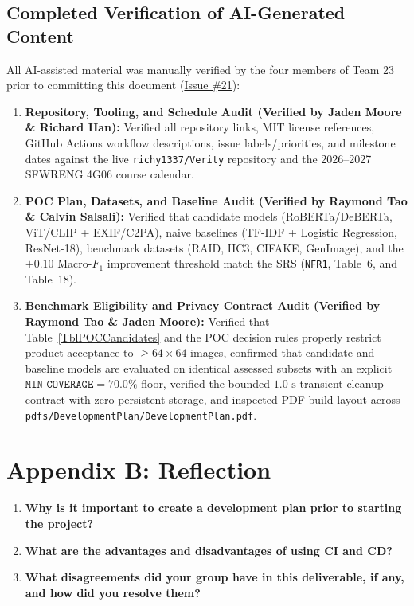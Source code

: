 \documentclass{article}
\begin{document}
\subsection*{Completed Verification of AI-Generated Content}
All AI-assisted material was manually verified by the four members of Team 23 prior to committing this document (\href{https://github.com/richy1337/Verity/issues/21}{Issue \#21}):
\begin{enumerate}[leftmargin=*]
    \item \textbf{Repository, Tooling, and Schedule Audit (Verified by Jaden Moore \& Richard Han):} Verified all repository links, MIT license references, GitHub Actions workflow descriptions, issue labels/priorities, and milestone dates against the live \texttt{richy1337/Verity} repository and the 2026--2027 SFWRENG 4G06 course calendar.
    \item \textbf{POC Plan, Datasets, and Baseline Audit (Verified by Raymond Tao \& Calvin Salsali):} Verified that candidate models (RoBERTa/DeBERTa, ViT/CLIP + EXIF/C2PA), naive baselines (TF-IDF + Logistic Regression, ResNet-18), benchmark datasets (RAID, HC3, CIFAKE, GenImage), and the $+0.10$ Macro-$F_1$ improvement threshold match the SRS (\texttt{NFR1}, Table~6, and Table~18).
    \item \textbf{Benchmark Eligibility and Privacy Contract Audit (Verified by Raymond Tao \& Jaden Moore):} Verified that Table~\ref{TblPOCCandidates} and the POC decision rules properly restrict product acceptance to $\ge 64\times 64$ images, confirmed that candidate and baseline models are evaluated on identical assessed subsets with an explicit $\texttt{MIN\_COVERAGE} = 70.0\%$ floor, verified the bounded $1.0\text{ s}$ transient cleanup contract with zero persistent storage, and inspected PDF build layout across \texttt{pdfs/\allowbreak{}DevelopmentPlan/\allowbreak{}DevelopmentPlan.pdf}.
\end{enumerate}

\newpage{}
\section*{Appendix B: Reflection}

\begin{enumerate}[leftmargin=*]
    \item \textbf{Why is it important to create a development plan prior to starting the project?}
    \item \textbf{What are the advantages and disadvantages of using CI and CD?}
    \item \textbf{What disagreements did your group have in this deliverable, if any, and how did you resolve them?}
\end{enumerate}
\end{document}
